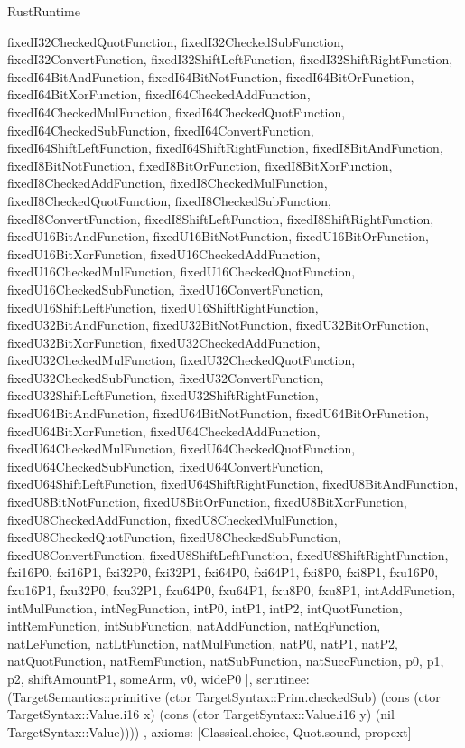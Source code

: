 \begin{lexlean}{RustRuntime}
\begin{semanticmodule}
{{      fixedI32CheckedQuotFunction,
      fixedI32CheckedSubFunction,
      fixedI32ConvertFunction,
      fixedI32ShiftLeftFunction,
      fixedI32ShiftRightFunction,
      fixedI64BitAndFunction,
      fixedI64BitNotFunction,
      fixedI64BitOrFunction,
      fixedI64BitXorFunction,
      fixedI64CheckedAddFunction,
      fixedI64CheckedMulFunction,
      fixedI64CheckedQuotFunction,
      fixedI64CheckedSubFunction,
      fixedI64ConvertFunction,
      fixedI64ShiftLeftFunction,
      fixedI64ShiftRightFunction,
      fixedI8BitAndFunction,
      fixedI8BitNotFunction,
      fixedI8BitOrFunction,
      fixedI8BitXorFunction,
      fixedI8CheckedAddFunction,
      fixedI8CheckedMulFunction,
      fixedI8CheckedQuotFunction,
      fixedI8CheckedSubFunction,
      fixedI8ConvertFunction,
      fixedI8ShiftLeftFunction,
      fixedI8ShiftRightFunction,
      fixedU16BitAndFunction,
      fixedU16BitNotFunction,
      fixedU16BitOrFunction,
      fixedU16BitXorFunction,
      fixedU16CheckedAddFunction,
      fixedU16CheckedMulFunction,
      fixedU16CheckedQuotFunction,
      fixedU16CheckedSubFunction,
      fixedU16ConvertFunction,
      fixedU16ShiftLeftFunction,
      fixedU16ShiftRightFunction,
      fixedU32BitAndFunction,
      fixedU32BitNotFunction,
      fixedU32BitOrFunction,
      fixedU32BitXorFunction,
      fixedU32CheckedAddFunction,
      fixedU32CheckedMulFunction,
      fixedU32CheckedQuotFunction,
      fixedU32CheckedSubFunction,
      fixedU32ConvertFunction,
      fixedU32ShiftLeftFunction,
      fixedU32ShiftRightFunction,
      fixedU64BitAndFunction,
      fixedU64BitNotFunction,
      fixedU64BitOrFunction,
      fixedU64BitXorFunction,
      fixedU64CheckedAddFunction,
      fixedU64CheckedMulFunction,
      fixedU64CheckedQuotFunction,
      fixedU64CheckedSubFunction,
      fixedU64ConvertFunction,
      fixedU64ShiftLeftFunction,
      fixedU64ShiftRightFunction,
      fixedU8BitAndFunction,
      fixedU8BitNotFunction,
      fixedU8BitOrFunction,
      fixedU8BitXorFunction,
      fixedU8CheckedAddFunction,
      fixedU8CheckedMulFunction,
      fixedU8CheckedQuotFunction,
      fixedU8CheckedSubFunction,
      fixedU8ConvertFunction,
      fixedU8ShiftLeftFunction,
      fixedU8ShiftRightFunction,
      fxi16P0,
      fxi16P1,
      fxi32P0,
      fxi32P1,
      fxi64P0,
      fxi64P1,
      fxi8P0,
      fxi8P1,
      fxu16P0,
      fxu16P1,
      fxu32P0,
      fxu32P1,
      fxu64P0,
      fxu64P1,
      fxu8P0,
      fxu8P1,
      intAddFunction,
      intMulFunction,
      intNegFunction,
      intP0,
      intP1,
      intP2,
      intQuotFunction,
      intRemFunction,
      intSubFunction,
      natAddFunction,
      natEqFunction,
      natLeFunction,
      natLtFunction,
      natMulFunction,
      natP0,
      natP1,
      natP2,
      natQuotFunction,
      natRemFunction,
      natSubFunction,
      natSuccFunction,
      p0,
      p1,
      p2,
      shiftAmountP1,
      someArm,
      v0,
      wideP0
    ],
    scrutinee: (TargetSemantics::primitive (ctor TargetSyntax::Prim.checkedSub) (cons (ctor TargetSyntax::Value.i16 x) (cons (ctor TargetSyntax::Value.i16 y) (nil TargetSyntax::Value))))
  },
  axioms: [Classical.choice, Quot.sound, propext]
}


\end{semanticmodule}
\end{lexlean}
